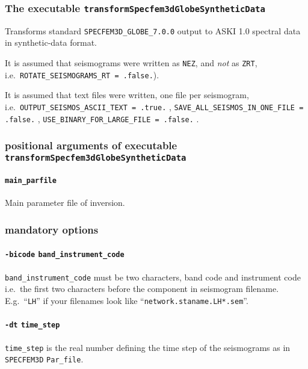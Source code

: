 \documentclass[12pt,a4paper]{article}
\newcommand{\lcode}[1]{\nolinkurl{#1}}
\newcommand{\ASKI}{ {\ttfamily ASKI} }
\begin{document}
\subsubsection*{The executable \lcode{transformSpecfem3dGlobeSyntheticData}}
Transforms standard \lcode{SPECFEM3D_GLOBE_7.0.0} output to \ASKI 1.0 spectral data in synthetic-data 
format.

It is assumed that seismograms were written as \lcode{NEZ}, and \emph{not} as \lcode{ZRT},
i.e.\ \lcode{ROTATE_SEISMOGRAMS_RT = .false.}). 

It is assumed that text files were written, one file per seismogram, 
i.e.\ \lcode{OUTPUT_SEISMOS_ASCII_TEXT = .true.} , \lcode{SAVE_ALL_SEISMOS_IN_ONE_FILE = .false.} , 
\lcode{USE_BINARY_FOR_LARGE_FILE = .false.} .

\subsubsection*{positional arguments of executable \lcode{transformSpecfem3dGlobeSyntheticData}}
\paragraph{\lcode{main_parfile}}
Main parameter file of inversion.
\subsubsection*{mandatory options}
\paragraph{\lcode{-bicode} \lcode{band_instrument_code}}
\lcode{band_instrument_code} must be two characters, band code and instrument code
i.e.\ the first two characters before the component in seismogram filename.
E.g.\ ``\lcode{LH}'' if your filenames look like ``\lcode{network.staname.LH*.sem}''.
\paragraph{\lcode{-dt} \lcode{time_step}}
\lcode{time_step} is the real number defining the time step of the seismograms as in \lcode{SPECFEM3D} \lcode{Par_file}.
\end{document}
